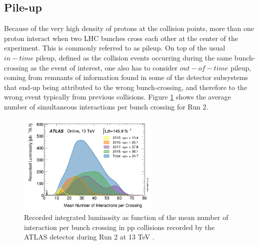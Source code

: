 \subsection{Pile-up}
\label{chap2:LHC:PU}
Because of the very high density of protons at the collision points, more than one proton interact when two LHC bunches cross each other at the center of the experiment. This is commonly referred to as pileup. On top of the usual $in-time$ pileup, defined as the collision events occurring during the same bunch-crossing as the event of interest, one also has to consider $out-of-time$ pileup, coming from remnants of information found in some of the detector subsystems that end-up being attributed to the wrong bunch-crossing, and therefore to the wrong event typically from previous collisions. Figure \ref{fig:chap2:LHC:PU} shows the average number of simultaneous interactions per bunch crossing for Run 2. \\
\begin{figure}[ht]
    \centering
    \includegraphics[width=0.6\textwidth]{Ch2/Img/PU.png}
    \caption{Recorded integrated luminosity as function of the mean number of interaction per bunch crossing in pp collisions recorded by the ATLAS detector during Run 2 at 13 TeV \cite{Lumi2018}.}
    \label{fig:chap2:LHC:PU}
\end{figure}

